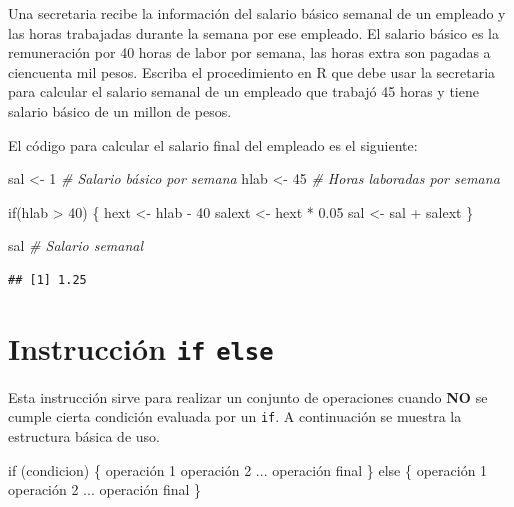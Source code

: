 \documentclass[10pt,]{krantz}
\makeatletter
\newenvironment{Shaded}{\begin{snugshade}}{\end{snugshade}}
\newcommand{\DecValTok}[1]{\textcolor[rgb]{0.00,0.00,0.81}{{#1}}}
\newcommand{\FloatTok}[1]{\textcolor[rgb]{0.00,0.00,0.81}{{#1}}}
\newcommand{\StringTok}[1]{\textcolor[rgb]{0.31,0.60,0.02}{{#1}}}
\newcommand{\CommentTok}[1]{\textcolor[rgb]{0.56,0.35,0.01}{\textit{{#1}}}}
\newcommand{\NormalTok}[1]{{#1}}
\let\proglang=\textsf
\newenvironment{kframe}{%
\medskip{}
\setlength{\fboxsep}{.8em}
 \def\at@end@of@kframe{}%
 \ifinner\ifhmode%
  \def\at@end@of@kframe{\end{minipage}}%
  \begin{minipage}{\columnwidth}%
 \fi\fi%
 \def\FrameCommand##1{\hskip\@totalleftmargin \hskip-\fboxsep
 \colorbox{shadecolor}{##1}\hskip-\fboxsep
     \hskip-\linewidth \hskip-\@totalleftmargin \hskip\columnwidth}%
 \MakeFramed {\advance\hsize-\width
   \@totalleftmargin\z@ \linewidth\hsize
   \@setminipage}}%
 {\par\unskip\endMakeFramed%
 \at@end@of@kframe}
\renewenvironment{Shaded}{\begin{kframe}}{\end{kframe}}
\makeatother
\begin{document}
Una secretaria recibe la información del salario básico semanal de un
empleado y las horas trabajadas durante la semana por ese empleado. El
salario básico es la remuneración por 40 horas de labor por semana, las
horas extra son pagadas a ciencuenta mil pesos. Escriba el procedimiento
en \proglang{R} que debe usar la secretaria para calcular el salario
semanal de un empleado que trabajó 45 horas y tiene salario básico de un
millon de pesos.

El código para calcular el salario final del empleado es el siguiente:

\begin{Shaded}
\begin{Highlighting}[]
\NormalTok{sal <-}\StringTok{ }\DecValTok{1}  \CommentTok{# Salario básico por semana}
\NormalTok{hlab <-}\StringTok{ }\DecValTok{45}   \CommentTok{# Horas laboradas por semana}

\NormalTok{if(hlab >}\StringTok{ }\DecValTok{40}\NormalTok{) \{}
  \NormalTok{hext <-}\StringTok{ }\NormalTok{hlab -}\StringTok{ }\DecValTok{40}
  \NormalTok{salext <-}\StringTok{ }\NormalTok{hext *}\StringTok{ }\FloatTok{0.05}
  \NormalTok{sal <-}\StringTok{ }\NormalTok{sal +}\StringTok{ }\NormalTok{salext}
\NormalTok{\}}

\NormalTok{sal  }\CommentTok{# Salario semanal}
\end{Highlighting}
\end{Shaded}

\begin{verbatim}
## [1] 1.25
\end{verbatim}

\section{\texorpdfstring{Instrucción \texttt{if} \texttt{else}
}{Instrucción if else }}\label{instruccion-if-else}

Esta instrucción sirve para realizar un conjunto de operaciones cuando
\textbf{NO} se cumple cierta condición evaluada por un \texttt{if}. A
continuación se muestra la estructura básica de uso.

\begin{Shaded}
\begin{Highlighting}[]
\NormalTok{if (condicion) \{}
  \NormalTok{operación }\DecValTok{1}
  \NormalTok{operación }\DecValTok{2}
  \NormalTok{...}
  \NormalTok{operación final}
\NormalTok{\}}
\NormalTok{else \{}
  \NormalTok{operación }\DecValTok{1}
  \NormalTok{operación }\DecValTok{2}
  \NormalTok{...}
  \NormalTok{operación final}
\NormalTok{\}}
\end{Highlighting}
\end{Shaded}
\end{document}
